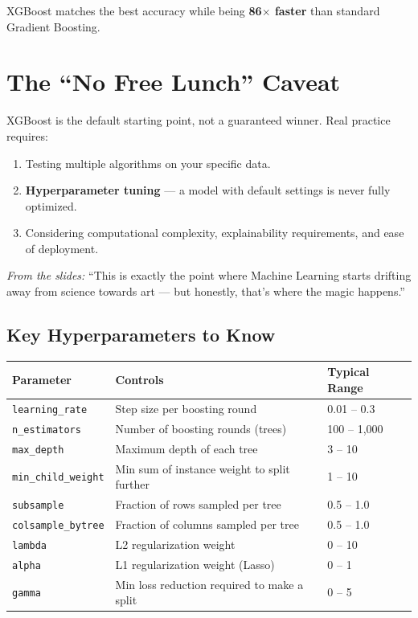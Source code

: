 \documentclass[11pt]{article}
\begin{document}
XGBoost matches the best accuracy while being \textbf{86$\times$ faster} than
standard Gradient Boosting.

\newpage
\section{The ``No Free Lunch'' Caveat}

XGBoost is the default starting point, not a guaranteed winner. Real practice
requires:

\begin{enumerate}
    \item Testing multiple algorithms on your specific data.
    \item \textbf{Hyperparameter tuning} --- a model with default settings is never
      fully optimized.
    \item Considering computational complexity, explainability requirements, and
      ease of deployment.
\end{enumerate}

\textit{From the slides:} ``This is exactly the point where Machine Learning starts
drifting away from science towards art --- but honestly, that's where the magic
happens.''

\subsection{Key Hyperparameters to Know}

\begin{center}
\begin{tabular}{@{}lll@{}}
\toprule
\textbf{Parameter}       & \textbf{Controls}                              & \textbf{Typical Range} \\
\midrule
\texttt{learning\_rate}  & Step size per boosting round                   & 0.01 -- 0.3            \\
\texttt{n\_estimators}   & Number of boosting rounds (trees)              & 100 -- 1{,}000         \\
\texttt{max\_depth}      & Maximum depth of each tree                     & 3 -- 10                \\
\texttt{min\_child\_weight} & Min sum of instance weight to split further & 1 -- 10                \\
\texttt{subsample}       & Fraction of rows sampled per tree              & 0.5 -- 1.0             \\
\texttt{colsample\_bytree} & Fraction of columns sampled per tree         & 0.5 -- 1.0             \\
\texttt{lambda}          & L2 regularization weight                       & 0 -- 10                \\
\texttt{alpha}           & L1 regularization weight (Lasso)               & 0 -- 1                 \\
\texttt{gamma}           & Min loss reduction required to make a split    & 0 -- 5                 \\
\bottomrule
\end{tabular}
\end{center}
\end{document}
